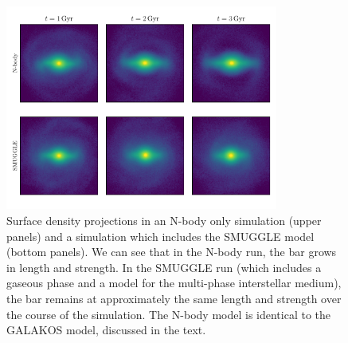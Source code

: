 \documentclass{natureprintstyle}
\begin{document}
\begin{figure}[h!]%
\centering
\includegraphics[width=0.8\textwidth]{fig/fig1.pdf}
\caption{Surface density projections in an N-body only simulation (upper
panels) and a simulation which includes the SMUGGLE model (bottom panels). We
can see that in the N-body run, the bar grows in length and strength. In the
SMUGGLE run (which includes a gaseous phase and a model for the multi-phase
interstellar medium), the bar remains at approximately the same length and
strength over the course of the simulation. The N-body model is identical to
the GALAKOS model, discussed in the text.}\label{fig:overview}
\end{figure}
\end{document}
